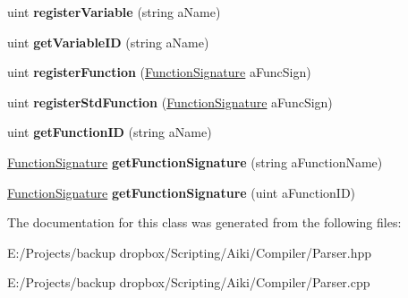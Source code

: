 \begin{DoxyCompactItemize}
\item 
\hypertarget{a00017_aace63234361457418d693085582af97c}{uint {\bfseries register\+Variable} (string a\+Name)}\label{a00017_aace63234361457418d693085582af97c}

\item 
\hypertarget{a00017_a24eef3cc93d434d84bf2b3de40745451}{uint {\bfseries get\+Variable\+I\+D} (string a\+Name)}\label{a00017_a24eef3cc93d434d84bf2b3de40745451}

\item 
\hypertarget{a00017_a92f74b87626da42f567a72ed100b4e96}{uint {\bfseries register\+Function} (\hyperlink{a00011}{Function\+Signature} a\+Func\+Sign)}\label{a00017_a92f74b87626da42f567a72ed100b4e96}

\item 
\hypertarget{a00017_a4a53a3a771671d563f221146db903c59}{uint {\bfseries register\+Std\+Function} (\hyperlink{a00011}{Function\+Signature} a\+Func\+Sign)}\label{a00017_a4a53a3a771671d563f221146db903c59}

\item 
\hypertarget{a00017_af8654197b3599c037c1a3f455f4ac819}{uint {\bfseries get\+Function\+I\+D} (string a\+Name)}\label{a00017_af8654197b3599c037c1a3f455f4ac819}

\item 
\hypertarget{a00017_aba4f206134629463121fcd61c40644f2}{\hyperlink{a00011}{Function\+Signature} {\bfseries get\+Function\+Signature} (string a\+Function\+Name)}\label{a00017_aba4f206134629463121fcd61c40644f2}

\item 
\hypertarget{a00017_a1b51b4ba165d214d50ba725428976175}{\hyperlink{a00011}{Function\+Signature} {\bfseries get\+Function\+Signature} (uint a\+Function\+I\+D)}\label{a00017_a1b51b4ba165d214d50ba725428976175}

\end{DoxyCompactItemize}


The documentation for this class was generated from the following files\+:\begin{DoxyCompactItemize}
\item 
E\+:/\+Projects/backup dropbox/\+Scripting/\+Aiki/\+Compiler/Parser.\+hpp\item 
E\+:/\+Projects/backup dropbox/\+Scripting/\+Aiki/\+Compiler/Parser.\+cpp\end{DoxyCompactItemize}
